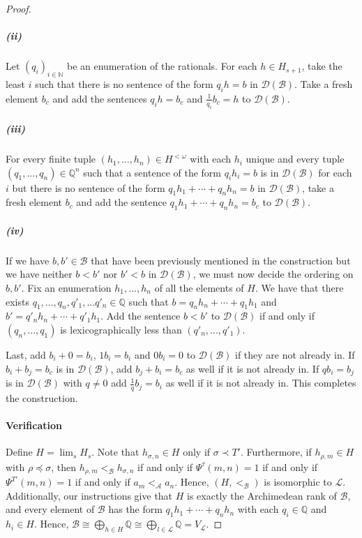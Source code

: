\documentclass{amsart}%
\numberwithin{theorem}{section}
\newcommand{\Q}{\mathbb{Q}}
\newcommand{\N}{\mathbb{N}}
\newcommand{\A}{\mathcal{A}}
\newcommand{\B}{\mathcal{B}}
\newcommand{\D}{\mathcal{D}}
\newcommand{\0}{\emptyset}
\newcommand{\lom}{^{< \omega}}
\newcommand{\LL}{\mathcal{L}}
\begin{document}
\begin{proof}
\subparagraph{(ii)} Let $(q_i)_{i\in \N}$ be an enumeration of the rationals. For each $h\in H_{s+1}$, take the least $i$ such that there is no sentence of the form $q_i h=b$ in $\D(\B)$. Take a fresh element $b_c$ and add the sentences $q_i h = b_c$ and $\frac{1}{q_i} b_c=h$ to $\D(\B)$. \\

\subparagraph{(iii)} For every finite tuple $(h_1,...,h_n)\in H\lom$ with each $h_i$ unique and every tuple $(q_1,...,q_n)\in\Q^n $ such that a sentence of the form $q_i h_i= b$ is in $\D(\B)$ for each $i$ but there is no sentence of the form $q_1h_1 + \cdots +q_nh_n= b $ in $\D(\B)$, take a fresh element $b_c$ and add the sentence $q_1h_1 + \cdots +q_nh_n= b_c$ to $\D(\B)$. \\

\subparagraph{(iv)} If we have $b,b'\in \B$ that have been previously mentioned in the construction but we have neither $b<b'$ nor $b'<b$ in $\D(\B)$, we must now decide the ordering on $b,b'$. Fix an enumeration $h_1,...,h_n$ of all the elements of $H$. We have that there exists $q_1,...,q_n,q'_1,...q'_n\in \Q$ such that $b=q_nh_n+ \cdots +q_1 h_1$ and $b'= q'_nh_n + \cdots +q'_1 h_1$. Add the sentence $b<b'$ to $\D(\B)$ if and only if $(q_n,...,q_1)$ is lexicographically less than $(q'_n,...,q'_1)$. 

Last, add $b_i+ 0 = b_i$, $1b_i=b_i$ and $0b_i= 0$ to $\D(\B)$ if they are not already in. If $b_i+b_j=b_c$ is in $\D(\B)$, add $b_j + b_i = b_c$ as well if it is not already in. If $qb_i=b_j$ is in $\D(\B)$ with $q\neq 0$ add $\frac{1}{q}b_j=b_i$ as well if it is not already in. This completes the construction.\\

\paragraph{Verification}
Define $H=\lim_sH_s$. Note that $h_{\sigma,n}\in H$ only if $\sigma\prec T'$. Furthermore, if $h_{\rho,m}\in H$ with $\rho\preceq\sigma$, then $h_{\rho,m}<_\B h_{\sigma,n}$ if and only if $\Psi^\tau(m,n)=1$ if and only if $\Psi^{T'}(m,n)=1$ if and only if $a_m<_\A a_n$. Hence, $(H,<_\B)$ is isomorphic to $\LL$. Additionally, our instructions give that $H$ is exactly the Archimedean rank of $\B$, and every element of $\B$ has the form $q_1 h_1 + \cdots + q_nh_n$ with each $q_i\in \Q$ and $h_i\in H$. Hence, $\B\cong \bigoplus_{h\in H} \Q \cong \bigoplus_{l\in \LL} \Q = V_\LL$. 
\end{proof}
\end{document}
